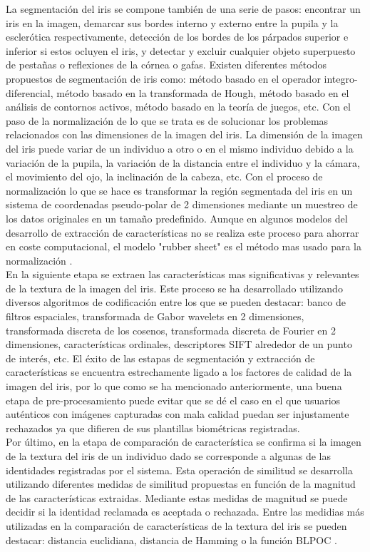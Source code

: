 La segmentación del iris se compone también de una serie de pasos: encontrar un iris en la imagen, demarcar sus bordes interno y externo entre la pupila y la esclerótica respectivamente, detección de los bordes de los párpados superior e inferior si estos ocluyen el iris, y detectar y excluir cualquier objeto superpuesto de pestañas o reflexiones de la córnea o gafas. Existen diferentes métodos propuestos de segmentación de iris como: método basado en el operador integro-diferencial, método basado en la transformada de Hough, método basado en el análisis de contornos activos, método basado en la teoría de juegos, etc. Con el paso de la normalización de lo que se trata es de solucionar los problemas relacionados con las dimensiones de la imagen del iris. La dimensión de la imagen del iris puede variar de un individuo a otro o en el mismo individuo debido a la variación de la pupila, la variación de la distancia entre el individuo y la cámara, el movimiento del ojo, la inclinación de la cabeza, etc. Con el proceso de normalización lo que se hace es transformar la región segmentada del iris en un sistema de coordenadas pseudo-polar de 2 dimensiones mediante un muestreo de los datos originales en un tamaño predefinido. Aunque en algunos modelos del desarrollo de extracción de características no se realiza este proceso para ahorrar en coste computacional, el modelo "rubber sheet" es el método mas usado para la normalización \cite{Reference9}. \\

En la siguiente etapa se extraen las características mas significativas y relevantes de la textura de la imagen del iris. Este proceso se ha desarrollado utilizando diversos algoritmos de codificación entre los que se pueden destacar: banco de filtros espaciales, transformada de Gabor wavelets en 2 dimensiones, transformada discreta de los cosenos, transformada discreta de Fourier en 2 dimensiones, características ordinales, descriptores SIFT alrededor de un punto de interés, etc. El éxito de las estapas de segmentación y extracción de características se encuentra estrechamente ligado a los factores de calidad de la imagen del iris, por lo que como se ha mencionado anteriormente, una buena etapa de pre-procesamiento puede evitar que se dé el caso en el que usuarios auténticos  con imágenes capturadas con mala calidad puedan ser injustamente rechazados ya que difieren de sus plantillas biométricas registradas. \\

Por último, en la etapa de comparación de característica se confirma si la imagen de la textura del iris de un individuo dado se corresponde a algunas de las identidades registradas por el sistema. Esta operación de similitud se desarrolla utilizando diferentes medidas de similitud propuestas en función de la magnitud de las características extraidas. Mediante estas medidas de magnitud se puede decidir si la identidad reclamada es aceptada o rechazada. Entre las medidias más utilizadas en la comparación de características de la textura del iris se pueden destacar: distancia euclidiana, distancia de Hamming o la función BLPOC \cite{Reference9}.\\


